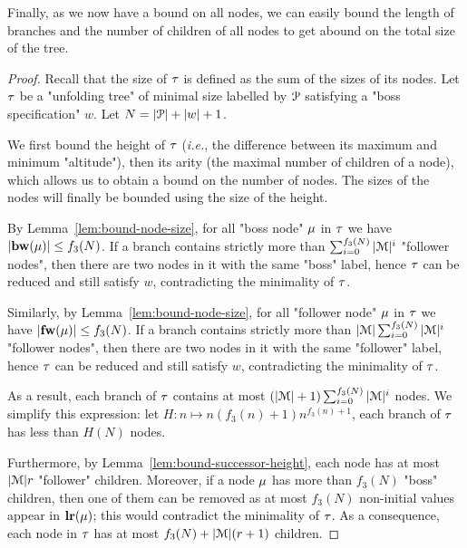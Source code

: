 Finally, as we now have a bound on all nodes, we can easily bound the length of branches and the number of children of all nodes to get abound on the total size of the tree.

\PropBoundTreeSize*


\begin{proof}
	Recall that the size of $\tau$ is defined as the sum of the sizes of its nodes. 
	Let $\tau$ be a "unfolding tree" of minimal size labelled by $\mathcal{P}$ satisfying a "boss specification" $w$. Let $N = |\mathcal{P}| + |w|+1$.
	
	We first bound the height of $\tau$ (\emph{i.e.}, the difference between its maximum and minimum "altitude"), then its arity (the maximal number of children of a node), which allows us to obtain a bound on the number of nodes. The sizes of the nodes will finally be bounded using the size of the height. 
	
	By Lemma~\ref{lem:bound-node-size}, for all "boss node" $\mu$ in $\tau$ we have $|\mathbf{bw}(\mu)| \leq f_3(N)$.
	If a branch contains strictly more than $\sum_{i=0}^{f_3(N)}|\mathcal{M}|^{i}$ "follower nodes", then there are two nodes in it with the same "boss" label, hence $\tau$ can be reduced and still satisfy $w$, contradicting the minimality of $\tau$.

	Similarly, by Lemma~\ref{lem:bound-node-size}, for all "follower node" $\mu$ in $\tau$ we have $|\mathbf{fw}(\mu)| \leq f_3(N)$.
	If a branch contains strictly more than $|\mathcal{M}| \sum_{i=0}^{f_3(N)}|\mathcal{M}|^{i}$ "follower nodes", then there are two nodes in it with the same "follower" label, hence $\tau$ can be reduced and still satisfy $w$, contradicting the minimality of $\tau$.
	
	As a result, each branch of $\tau$ contains at most $(|\mathcal{M}|+1) \sum_{i=0}^{f_3(N)}|\mathcal{M}|^{i}$ nodes. We simplify this expression: let $H: n \mapsto n (f_3(n)+1) n^{f_3(n)+1}$, each branch of $\tau$ has less than $H(N)$ nodes.
	
	Furthermore, by Lemma~\ref{lem:bound-successor-height}, each node has at most $|\mathcal{M}|r$ "follower" children. Moreover, if a node $\mu$ has more than $f_3(N)$ "boss" children, then one of them can be removed as at most $f_3(N)$ non-initial values appear in $\mathbf{lr}(\mu)$; this would contradict the minimality of $\tau$.	
	As a consequence, each node in $\tau$ has at most $f_3(N) + |\mathcal{M}|(r+1)$ children.


\end{proof}

